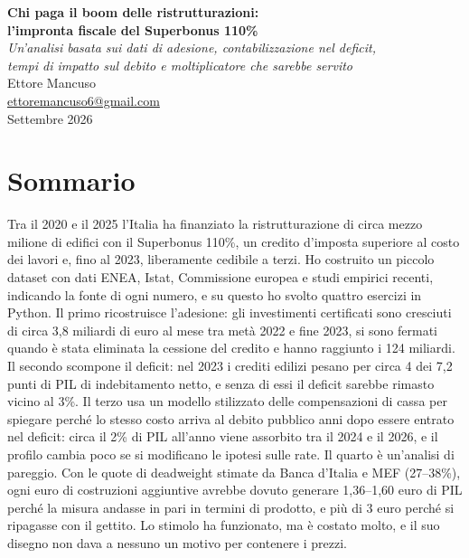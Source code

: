 \documentclass[11pt,a4paper]{article}
\begin{document}
\thispagestyle{empty}
\begin{center}
{\LARGE\bfseries Chi paga il boom delle ristrutturazioni:\\[4pt] l'impronta fiscale del Superbonus 110\%}\\[10pt]
{\large\itshape Un'analisi basata sui dati di adesione, contabilizzazione nel deficit,\\ tempi di impatto sul debito e moltiplicatore che sarebbe servito}\\[22pt]
{\large Ettore Mancuso}\\[1pt]
\href{mailto:ettoremancuso6@gmail.com}{ettoremancuso6@gmail.com}\\[1pt]
Settembre 2026
\end{center}
\vspace{16pt}

\section*{Sommario}
Tra il 2020 e il 2025 l'Italia ha finanziato la ristrutturazione di circa mezzo milione di edifici con il Superbonus 110\%, un credito d'imposta superiore al costo dei lavori e, fino al 2023, liberamente cedibile a terzi. Ho costruito un piccolo dataset con dati ENEA, Istat, Commissione europea e studi empirici recenti, indicando la fonte di ogni numero, e su questo ho svolto quattro esercizi in Python. Il primo ricostruisce l'adesione: gli investimenti certificati sono cresciuti di circa 3,8 miliardi di euro al mese tra metà 2022 e fine 2023, si sono fermati quando è stata eliminata la cessione del credito e hanno raggiunto i 124 miliardi. Il secondo scompone il deficit: nel 2023 i crediti edilizi pesano per circa 4 dei 7,2 punti di PIL di indebitamento netto, e senza di essi il deficit sarebbe rimasto vicino al 3\%. Il terzo usa un modello stilizzato delle compensazioni di cassa per spiegare perché lo stesso costo arriva al debito pubblico anni dopo essere entrato nel deficit: circa il 2\% di PIL all'anno viene assorbito tra il 2024 e il 2026, e il profilo cambia poco se si modificano le ipotesi sulle rate. Il quarto è un'analisi di pareggio. Con le quote di deadweight stimate da Banca d'Italia e MEF (27--38\%), ogni euro di costruzioni aggiuntive avrebbe dovuto generare 1,36--1,60 euro di PIL perché la misura andasse in pari in termini di prodotto, e più di 3 euro perché si ripagasse con il gettito. Lo stimolo ha funzionato, ma è costato molto, e il suo disegno non dava a nessuno un motivo per contenere i prezzi.
\end{document}
